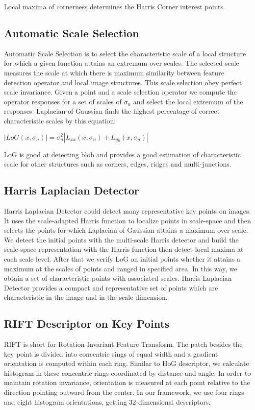 \documentclass[10pt,twocolumn,letterpaper]{article}
\begin{document}
Local maxima of cornerness determines the Harris Corner interest points.

\subsection{Automatic Scale Selection}
Automatic Scale Selection is to select the characteristic scale of a local structure for which a given function attains an extremum over scales.
The selected scale measures the scale at which there is maximum similarity between feature detection operator and local image structures. This scale selection obey perfect scale invariance. Given a point and a scale selection operator we compute the operator responses for a set of scales of $\sigma_{n}$ and select the local extremum of the responses. Laplacian-of-Gaussian finds the highest percentage of correct characteristic scales by this equation:

$|LoG(x, \sigma_{n})|=\sigma_{n}^{2}|L_{xx}(x, \sigma_{n})+L_{yy}(x, \sigma_{n})|$ 

LoG is good at detecting blob and provides a good estimation of characteristic scale for other structures such as corners, edges, ridges and multi-junctions.

\subsection{Harris Laplacian Detector}
Harris Laplacian Detector could detect many representative key points on images. It uses the scale-adapted Harris function to localize points in scale-space and then selects the points for which Laplacian of Gaussian attains a maximum over scale. We detect the initial points with the multi-scale Harris detector and build the scale-space representation with the Harris function then detect local maxima at each scale level. After that we verify LoG on initial points whether it attains a maximum at the scales of points and ranged in specified area. In this way, we obtain a set of characteristic points with associated scales. Harris Laplacian Detector provides a compact and representative set of points which are characteristic in the image and in the scale dimension.

\subsection{RIFT Descriptor on Key Points}
RIFT is short for Rotation-Invariant Feature Transform. The patch besides the key point is divided into concentric rings of equal width and a gradient orientation is computed within each ring. Similar to HoG descriptor, we calculate histogram in these concentric rings coordinated by distance and angle. In order to maintain rotation invariance, orientation
is measured at each point relative to the direction pointing outward from the center. In our framework, we
use four rings and eight histogram orientations, getting 32-dimensional descriptors. 
\end{document}
